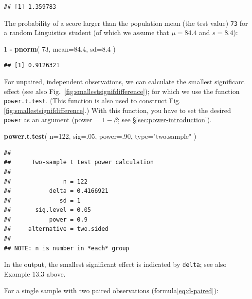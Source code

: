 \documentclass[
]{book}
\newenvironment{Shaded}{\begin{snugshade}}{\end{snugshade}}
\newcommand{\AttributeTok}[1]{\textcolor[rgb]{0.13,0.29,0.53}{#1}}
\newcommand{\DecValTok}[1]{\textcolor[rgb]{0.00,0.00,0.81}{#1}}
\newcommand{\FloatTok}[1]{\textcolor[rgb]{0.00,0.00,0.81}{#1}}
\newcommand{\FunctionTok}[1]{\textcolor[rgb]{0.13,0.29,0.53}{\textbf{#1}}}
\newcommand{\NormalTok}[1]{#1}
\newcommand{\SpecialCharTok}[1]{\textcolor[rgb]{0.81,0.36,0.00}{\textbf{#1}}}
\newcommand{\StringTok}[1]{\textcolor[rgb]{0.31,0.60,0.02}{#1}}
\begin{document}
\begin{verbatim}
## [1] 1.359783
\end{verbatim}

The probability of a score larger than the population mean (the test value) \texttt{73} for a random Linguistics
student (of which we assume that \(\mu=84.4\) and \(s=8.4\)):

\begin{Shaded}
\begin{Highlighting}[]
\DecValTok{1} \SpecialCharTok{{-}} \FunctionTok{pnorm}\NormalTok{( }\DecValTok{73}\NormalTok{, }\AttributeTok{mean=}\FloatTok{84.4}\NormalTok{, }\AttributeTok{sd=}\FloatTok{8.4}\NormalTok{ ) }
\end{Highlighting}
\end{Shaded}

\begin{verbatim}
## [1] 0.9126321
\end{verbatim}

For unpaired, independent observations, we can calculate the smallest
significant effect (see also
Fig.~\ref{fig:smallestsignifdifference}); for which we use the function
\texttt{power.t.test}. (This function is
also used to construct Fig.\ref{fig:smallestsignifdifference}.)
With this function, you have to set the desired \texttt{power} as
an argument (power = \(1-\beta\); see
§\ref{sec:power-introduction}).

\begin{Shaded}
\begin{Highlighting}[]
\FunctionTok{power.t.test}\NormalTok{( }\AttributeTok{n=}\DecValTok{122}\NormalTok{, }\AttributeTok{sig=}\NormalTok{.}\DecValTok{05}\NormalTok{, }\AttributeTok{power=}\NormalTok{.}\DecValTok{90}\NormalTok{, }\AttributeTok{type=}\StringTok{"two.sample"}\NormalTok{ )}
\end{Highlighting}
\end{Shaded}

\begin{verbatim}
## 
##      Two-sample t test power calculation 
## 
##               n = 122
##           delta = 0.4166921
##              sd = 1
##       sig.level = 0.05
##           power = 0.9
##     alternative = two.sided
## 
## NOTE: n is number in *each* group
\end{verbatim}

In the output, the smallest significant effect is indicated by \texttt{delta}; see also
Example 13.3 above.

For a single sample with two paired observations
(formula\eqref{eq:d-paired}):
\end{document}
